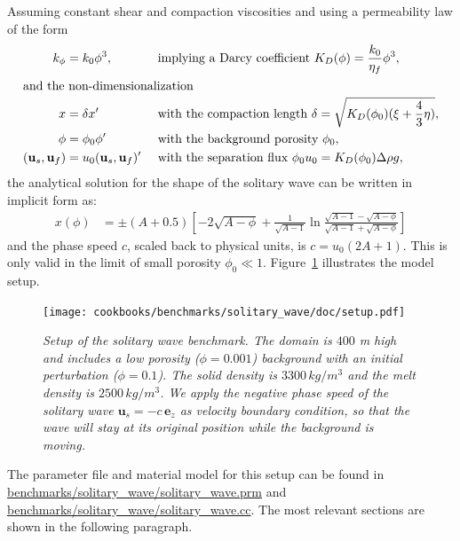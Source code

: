 \documentclass{article}
\begin{document}
Assuming constant shear and compaction viscosities and using a permeability law of the form
%
\begin{align*}
k_\phi &= k_0 \phi^3, && \text{ implying a Darcy coefficient }
K_D(\phi) = \frac{k_0}{\eta_f} \phi^3 , \\
\intertext{and the non-dimensionalization }
x &= \delta x'
  && \text{ with the compaction length } \delta = \sqrt{K_D(\phi_0)(\xi + \frac{4}{3}\eta)} , \\
\phi &= \phi_0 \phi '
  && \text{ with the background porosity } \phi_0 , \\
(\mathbf u_s, \mathbf u_f) &= u_0 (\mathbf u_s, \mathbf u_f)'
  && \text{ with the separation flux } \phi_0 u_0 = K_D(\phi_0) \Delta\rho g ,
\end{align*}
%
the analytical solution for the shape of the solitary wave can be written in implicit form as:
\begin{align*}
x(\phi) &= \pm (A + 0.5)
\left[ -2 \sqrt{A-\phi} + \frac{1}{\sqrt{A-1}}
\ln \frac{\sqrt{A-1} - \sqrt{A-\phi}}{\sqrt{A-1} + \sqrt{A-\phi}} \right]
\end{align*}
and the phase speed $c$, scaled back to physical units, is $c = u_0 (2A+1)$.
This is only valid in the limit of small porosity $\phi_0 \ll 1$. Figure~\ref{fig:setup-solitary-wave} illustrates the model setup.

\begin{figure}
  \begin{center}
    \texttt{[image: cookbooks/benchmarks/solitary\_wave/doc/setup.pdf]}
  \end{center}
  \caption{\it Setup of the solitary wave benchmark. The domain is $400$ m high and includes a low porosity
  ($\phi = 0.001$) background with an initial perturbation ($\phi = 0.1$). The solid density is $3300\,kg/m^3$
  and the melt density is $2500\,kg/m^3$. We apply the negative phase speed
  of the solitary wave $\mathbf u_s = -c \, \mathbf e_z$ as velocity boundary condition, so that the wave will
  stay at its original position while the background is moving.}
  \label{fig:setup-solitary-wave}
\end{figure}

The parameter file and material model for this setup can be found in \url{benchmarks/solitary_wave/solitary_wave.prm} and \url{benchmarks/solitary_wave/solitary_wave.cc}. The most relevant sections are shown in the following paragraph.


\end{document}

